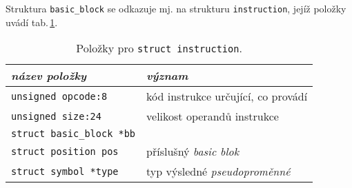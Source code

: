 Struktura \texttt{basic\_block} se odkazuje mj. na strukturu \texttt{instruction},
jejíž položky uvádí tab.\,\ref{tab:instruction}.

\begin{table}[!h]
    \begin{center}
        \begin{tabular}{|l|l|}
            \hline
            \textsl{název položky} & \textsl{význam} \\
            \hline
	            \texttt{unsigned opcode:8} & kód instrukce určující, co provádí\\
            	\texttt{unsigned size:24} & velikost operandů instrukce \\
                \texttt{struct basic\_block *bb} & \\
                \texttt{struct position pos} & příslušný \emph{basic blok}\\
                \texttt{struct symbol *type} & typ výsledné \emph{pseudoproměnné}\\
            \hline
        \end{tabular}
        \caption{Položky pro \texttt{struct instruction}.}
        \label{tab:instruction}
    \end{center}
\end{table}
